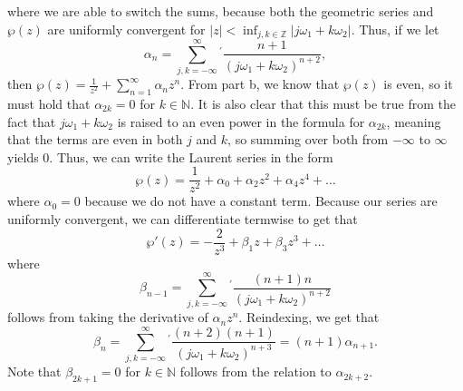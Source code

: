 \documentclass{article}
\begin{document}
where we are able to switch the sums, because both the geometric series and $\wp(z)$ are uniformly convergent for $|z|<\inf_{j,k\in\mathbb{Z}}|j\omega_1+k\omega_2|$. Thus, if we let 
\[
\alpha_n=\sum_{j,k=-\infty}^{\infty}{}^{'}\frac{n+1}{(j\omega_1+k\omega_2)^{n+2}},
\]
then $\wp(z)=\frac{1}{z^2}+\sum_{n=1}^\infty\alpha_nz^n$. From part b, we know that $\wp(z)$ is even, so it must hold that $\alpha_{2k}=0$ for $k\in\mathbb{N}$. It is also clear that this must be true from the fact that $j\omega_1+k\omega_2$ is raised to an even power in the formula for $\alpha_{2k}$, meaning that the terms are even in both $j$ and $k$, so summing over both from $-\infty$ to $\infty$ yields 0. Thus, we can write the Laurent series in the form
\[
\wp(z)=\frac{1}{z^2}+\alpha_0+\alpha_2 z^2+\alpha_4 z^4+\ldots
\]
where $\alpha_0=0$ because we do not have a constant term.
Because our series are uniformly convergent, we can differentiate termwise to get that 
\[
		\wp'(z)=-\frac{2}{z^3}+\beta_1 z+\beta_3 z^3+\ldots
\]
where 
\[
\beta_{n-1}=\sum_{j,k=-\infty}^{\infty}{}^{'}\frac{(n+1)n}{(j\omega_1+k\omega_2)^{n+2}}
\]
follows from taking the derivative of $\alpha_nz^n$. Reindexing, we get that 
\[
\beta_n=\sum_{j,k=-\infty}^{\infty}{}^{'}\frac{(n+2)(n+1)}{(j\omega_1+k\omega_2)^{n+3}}=(n+1)\alpha_{n+1}.
\]
Note that $\beta_{2k+1}=0$ for $k\in\mathbb{N}$ follows from the relation to $\alpha_{2k+2}$. 
\end{document}
